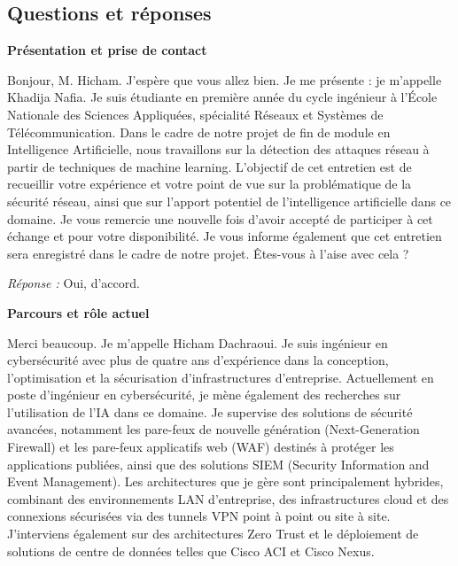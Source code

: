 \documentclass[12pt,a4paper]{report}
\begin{document}
\subsection*{Questions et réponses}

\textbf{Présentation et prise de contact}

Bonjour, M. Hicham. J'esp\`{e}re que vous allez bien. Je me pr\'{e}sente : je m'appelle Khadija Nafia. Je suis \'{e}tudiante en premi\`{e}re ann\'{e}e du cycle ing\'{e}nieur \`{a} l'\'{E}cole Nationale des Sciences Appliqu\'{e}es, sp\'{e}cialit\'{e} R\'{e}seaux et Syst\`{e}mes de T\'{e}l\'{e}communication. Dans le cadre de notre projet de fin de module en Intelligence Artificielle, nous travaillons sur la d\'{e}tection des attaques r\'{e}seau \`{a} partir de techniques de machine learning. L'objectif de cet entretien est de recueillir votre exp\'{e}rience et votre point de vue sur la probl\'{e}matique de la s\'{e}curit\'{e} r\'{e}seau, ainsi que sur l'apport potentiel de l'intelligence artificielle dans ce domaine. Je vous remercie une nouvelle fois d'avoir accept\'{e} de participer \`{a} cet \'{e}change et pour votre disponibilit\'{e}. Je vous informe \'{e}galement que cet entretien sera enregistr\'{e} dans le cadre de notre projet. \^{E}tes-vous \`{a} l'aise avec cela ?

\medskip
\textit{R\'{e}ponse :} Oui, d'accord.

\bigskip
\textbf{Parcours et rôle actuel}

Merci beaucoup. Je m'appelle Hicham Dachraoui. Je suis ing\'{e}nieur en cybers\'{e}curit\'{e} avec plus de quatre ans d'exp\'{e}rience dans la conception, l'optimisation et la s\'{e}curisation d'infrastructures d'entreprise. Actuellement en poste d'ing\'{e}nieur en cybers\'{e}curit\'{e}, je m\`{e}ne \'{e}galement des recherches sur l'utilisation de l'IA dans ce domaine. Je supervise des solutions de s\'{e}curit\'{e} avanc\'{e}es, notamment les pare-feux de nouvelle g\'{e}n\'{e}ration (Next-Generation Firewall) et les pare-feux applicatifs web (WAF) destin\'{e}s \`{a} prot\'{e}ger les applications publi\'{e}es, ainsi que des solutions SIEM (Security Information and Event Management). Les architectures que je g\`{e}re sont principalement hybrides, combinant des environnements LAN d'entreprise, des infrastructures cloud et des connexions s\'{e}curis\'{e}es via des tunnels VPN point \`{a} point ou site \`{a} site. J'interviens \'{e}galement sur des architectures Zero Trust et le d\'{e}ploiement de solutions de centre de donn\'{e}es telles que Cisco ACI et Cisco Nexus.
\end{document}
